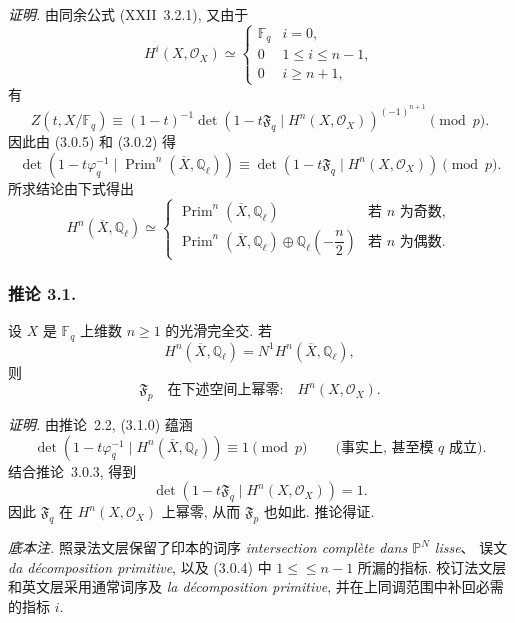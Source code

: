\medskip
\noindent\emph{证明.}
由同余公式 (XXII~3.2.1), 又由于
\begin{equation}\tag{3.0.4}
H^i(X,\mathcal O_X)\simeq
\begin{cases}
\mathbb F_q & i=0,\\[1.5ex]
0 & 1\leq i\leq n-1,\\[1.5ex]
0 & i\geq n+1,
\end{cases}
\end{equation}
有
\begin{equation}\tag{3.0.5}
Z(t,X/\mathbb F_q)\equiv
(1-t)^{-1}
\det\!\left(1-t\mathfrak F_q\mid H^n(X,\mathcal O_X)\right)^{(-1)^{n+1}}
\pmod p.
\end{equation}
因此由 (3.0.5) 和 (3.0.2) 得
\begin{equation}\tag{3.0.6}
\det\!\left(1-t\varphi_q^{-1}\mid
\operatorname{Prim}^n(\overline X,\mathbb Q_\ell)\right)
\equiv
\det\!\left(1-t\mathfrak F_q\mid H^n(X,\mathcal O_X)\right)
\pmod p.
\end{equation}
所求结论由下式得出
\begin{equation}\tag{3.0.7}
H^n(\overline X,\mathbb Q_\ell)\simeq
\begin{cases}
\operatorname{Prim}^n(\overline X,\mathbb Q_\ell)
  & \text{若 $n$ 为奇数},\\[2mm]
\operatorname{Prim}^n(\overline X,\mathbb Q_\ell)
 \oplus\mathbb Q_\ell\!\left(-\dfrac n2\right)
  & \text{若 $n$ 为偶数}.
\end{cases}
\end{equation}

\subsubsection*{推论 3.1.}
设 $X$ 是 $\mathbb F_q$ 上维数 $n\geq1$ 的光滑完全交. 若
\begin{equation}\tag{3.1.0}
H^n(\overline X,\mathbb Q_\ell)=N^1H^n(\overline X,\mathbb Q_\ell),
\end{equation}
则
\begin{equation}\tag{3.1.1}
\mathfrak F_p\quad\text{在下述空间上幂零:}\quad H^n(X,\mathcal O_X).
\end{equation}

\medskip
\noindent\emph{证明.}
由推论~2.2, (3.1.0) 蕴涵
\begin{equation}\tag{3.1.2}
\det\!\left(1-t\varphi_q^{-1}\mid
H^n(\overline X,\mathbb Q_\ell)\right)
\equiv1\pmod p
\qquad\text{(事实上, 甚至模 $q$ 成立)}.
\end{equation}
结合推论~3.0.3, 得到
\begin{equation}\tag{3.1.3}
\det\!\left(1-t\mathfrak F_q\mid H^n(X,\mathcal O_X)\right)=1.
\end{equation}
因此 $\mathfrak F_q$ 在 $H^n(X,\mathcal O_X)$ 上幂零, 从而 $\mathfrak F_p$ 也如此.
推论得证.

\medskip
\noindent\emph{底本注.}
照录法文层保留了印本的词序 \emph{intersection complète dans $\mathbb P^N$ lisse}、
误文 \emph{da décomposition primitive}, 以及 (3.0.4) 中
$1\leq{}\leq n-1$ 所漏的指标. 校订法文层和英文层采用通常词序及
\emph{la décomposition primitive}, 并在上同调范围中补回必需的指标 $i$.
